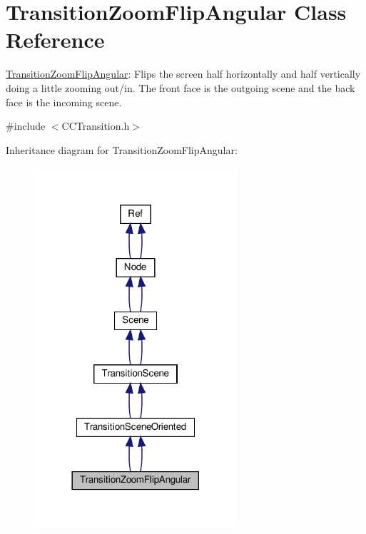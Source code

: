\hypertarget{classTransitionZoomFlipAngular}{}\section{Transition\+Zoom\+Flip\+Angular Class Reference}
\label{classTransitionZoomFlipAngular}


\hyperlink{classTransitionZoomFlipAngular}{Transition\+Zoom\+Flip\+Angular}\+: Flips the screen half horizontally and half vertically doing a little zooming out/in. The front face is the outgoing scene and the back face is the incoming scene.  




{\ttfamily \#include $<$C\+C\+Transition.\+h$>$}



Inheritance diagram for Transition\+Zoom\+Flip\+Angular\+:
\nopagebreak
\begin{figure}[H]
\begin{center}
\leavevmode
\includegraphics[width=213pt]{classTransitionZoomFlipAngular__inherit__graph}
\end{center}
\end{figure}


